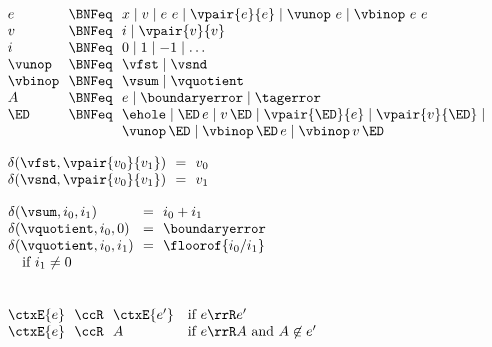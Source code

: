 \begin{flushleft}

\\
$\begin{array}{l@{~~}c@{~~}l}
  e & \BNFeq & x \mid v \mid e~e \mid \vpair{e}{e} \mid \vunop~e \mid \vbinop~e~e
\\
  v & \BNFeq & i \mid \vpair{v}{v}
\\
  i & \BNFeq & 0 \mid 1 \mid -1 \mid \ldots
\\
  \vunop & \BNFeq & \vfst \mid \vsnd
\\
  \vbinop & \BNFeq & \vsum \mid \vquotient
\\
  A & \BNFeq & e \mid \boundaryerror \mid \tagerror
\\
  \ED & \BNFeq & \ehole \mid \ED\,e \mid v\,\ED \mid \vpair{\ED}{e} \mid \vpair{v}{\ED} \mid
\\ & & \vunop\,\ED \mid \vbinop\,\ED\,e \mid \vbinop\,v\,\ED
\end{array}$

\medskip
\begin{minipage}[t]{0.38\columnwidth}
$\begin{array}{l@{~~}c@{~~}l}
  \delta(\vfst, \vpair{v_0}{v_1}) & = & v_0
\\
  \delta(\vsnd, \vpair{v_0}{v_1}) & = & v_1
\end{array}$
\end{minipage}%
\begin{minipage}[t]{0.5\columnwidth}
$\begin{array}{l@{~~}c@{~~}l}
  \delta(\vsum, i_0, i_1) & = & i_0 + i_1
\\
  \delta(\vquotient, i_0, 0) & = & \boundaryerror
\\
  \delta(\vquotient, i_0, i_1) & = & \floorof{i_0 / i_1}
\\ \multicolumn{3}{l}{\mbox{\quad if $i_1 \neq 0$}}
\end{array}$
\end{minipage}

\\
$\begin{array}{l@{~~}c@{~~}l l}
\ctxE{e} & \ccR & \ctxE{e'} & \mbox{if $e \rrR e'$}
\\
\ctxE{e} & \ccR & A         & \mbox{if $e \rrR A$ and $A \not\in e'$}
\end{array}$

\end{flushleft}
